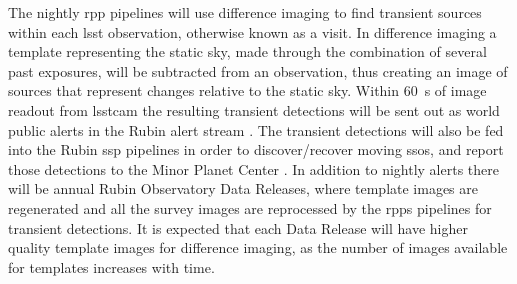 \documentclass[preprintm,linenumbers]{aastex631}
\begin{document}
	The nightly \gls*{rpp} pipelines will use difference imaging to find transient sources within each \gls*{lsst} observation, otherwise known as a visit. 
 In difference imaging a template representing the static sky, made through the combination of several past exposures, will be subtracted from an observation, thus creating an image of sources that represent changes relative to the static sky. 
 Within 60\ s of image readout from \gls*{lsstcam} the resulting transient detections will be sent out as world public alerts in the Rubin alert stream \citep{lsstSRD, 2019ApJ...873..111I, LDM-612, LSE-163, RTN-011}. 
 The transient detections will also be fed into the Rubin \gls*{ssp} pipelines in order to discover/recover moving \glspl*{sso}, and report those detections to the Minor Planet Center \citep{2019ApJ...873..111I,lsstMOPS,lsstSSP}. 
In addition to nightly alerts there will be annual Rubin Observatory Data Releases, where template images are regenerated and all the survey images are reprocessed by the \glspl*{rpp} pipelines for transient detections.
It is expected that each Data Release will have higher quality template images for difference imaging, as the number of images available for templates increases with time.
 
\end{document}
